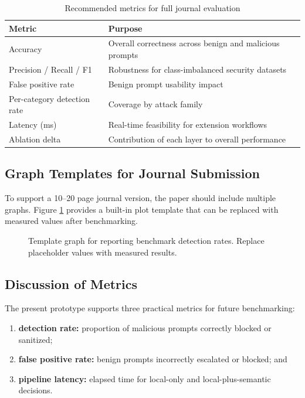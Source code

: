 \documentclass[journal]{IEEEtran}
\begin{document}
\begin{table}[ht]
\caption{Recommended metrics for full journal evaluation}
\label{tab:metrics}
\centering
\begin{tabular}{p{2.5cm}p{4.6cm}}
\toprule
\textbf{Metric} & \textbf{Purpose} \\ \midrule
Accuracy & Overall correctness across benign and malicious prompts \\
Precision / Recall / F1 & Robustness for class-imbalanced security datasets \\
False positive rate & Benign prompt usability impact \\
Per-category detection rate & Coverage by attack family \\
Latency (ms) & Real-time feasibility for extension workflows \\
Ablation delta & Contribution of each layer to overall performance \\ \bottomrule
\end{tabular}
\end{table}

\subsection{Graph Templates for Journal Submission}
To support a 10--20 page journal version, the paper should include multiple graphs. Figure \ref{fig:graph-template} provides a built-in plot template that can be replaced with measured values after benchmarking.

\begin{figure}[ht]
\centering
{}
\caption{Template graph for reporting benchmark detection rates. Replace placeholder values with measured results.}
\label{fig:graph-template}
\end{figure}

\subsection{Discussion of Metrics}
The present prototype supports three practical metrics for future benchmarking:
\begin{enumerate}
    \item \textbf{detection rate:} proportion of malicious prompts correctly blocked or sanitized;
    \item \textbf{false positive rate:} benign prompts incorrectly escalated or blocked; and
    \item \textbf{pipeline latency:} elapsed time for local-only and local-plus-semantic decisions.
\end{enumerate}
\end{document}

